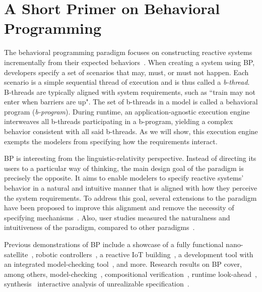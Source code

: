 \documentclass[10pt,journal,compsoc]{IEEEtran}
\theoremstyle{definition}
\begin{document}
\section{A Short Primer on Behavioral Programming}
\label{sec:bp}
The behavioral programming paradigm focuses on constructing reactive systems incrementally from their expected behaviors~\cite{harel2012behavioral,Elyasaf2020COBP}. When creating a system using BP, developers specify a set of scenarios that may, must, or must not happen. Each scenario is a simple sequential thread of execution and is thus called a \emph{b-thread}. B-threads are typically aligned with system requirements, such as ``train may not enter when barriers are up". The set of b-threads in a model is called a behavioral program (\emph{b-program}). During runtime, an application-agnostic execution engine interweaves all b-threads participating in a b-program, yielding a complex behavior consistent with all said b-threads. As we will show, this execution engine exempts the modelers from specifying how the requirements interact.

BP is interesting from the linguistic-relativity perspective. Instead of directing its users to a particular way of thinking, the main design goal of the paradigm is precisely the opposite. It aims to enable modelers to specify reactive systems' behavior in a natural and intuitive manner that is aligned with how they perceive the system requirements. To address this goal, several extensions to the paradigm have been proposed to improve this alignment and remove the necessity of specifying mechanisms~\cite{marron2012decentralized,elyasaf2018context,Elyasaf2020COBP}. Also, user studies measured the naturalness and intuitiveness of the paradigm, compared to other paradigms~\cite{Alexandron2014SBPa, Harel2009TeachingVisualFormalisms}. 

Previous demonstrations of BP include a showcase of a fully functional nano-satellite~\cite{bar2019scenario}, robotic controllers~\cite{elyasaf2019using, katz2019fly}, a reactive IoT building~\cite{elyasaf2018context}, a development tool with an integrated model-checking tool~\cite{bar2018bpjs}, and more. Research results on BP cover, among others, model-checking~\cite{harel2011model}, compositional verification~\cite{harel2013relaxing}, runtime look-ahead~\cite{harel2002smart}, synthesis~\cite{kugler2011synthesizing} interactive analysis of unrealizable specification~\cite{maoz2013counter}.
 
\end{document}
